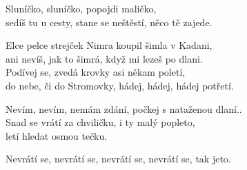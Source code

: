 \nv{}Sluníčko, sluníčko, popojdi maličko,\\
sedíš tu u cesty, stane se neštěstí, něco tě zajede.\\
\vnv

\nv{}Elce pelce strejček Nimra koupil šimla v Kadani,\\
ani nevíš, jak to šimrá, když mi lezeš po dlani.\\
Podívej se, zvedá krovky asi někam poletí,\\
do ne\mm be, či do Stromovky, hádej, hádej, hádej potřetí.\\
\vnv

\nv{}Nevím, nevím, nemám zdání, počkej s nataženou dlaní..\\
Snad se vrátí za chviličku, i ty malý popleto,\\
letí \mm hledat osmou tečku.\\
\vnv

\nv{}Nevrátí se, nevrátí se, nevrátí se, nevrátí se, tak je\sm  {}to.
\newpage
